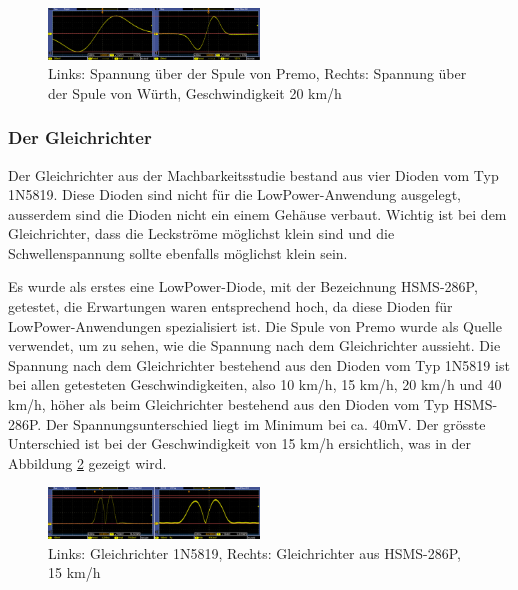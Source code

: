 \begin{figure}[ht]
    \includegraphics[width=0.5\textwidth]{3Vorgehen/imag/Messung_Optimierung_Spule.png}
    \caption{Links: Spannung über der Spule von Premo, Rechts: Spannung über der Spule von Würth, Geschwindigkeit 20 km/h}               
    \label{messung_optimierung_spule} 
\end{figure}

\subsubsection{Der Gleichrichter}

Der Gleichrichter aus der Machbarkeitsstudie bestand aus vier Dioden vom Typ 1N5819. Diese Dioden sind nicht für die LowPower-Anwendung ausgelegt, ausserdem sind die Dioden nicht ein einem Gehäuse verbaut. Wichtig ist bei dem Gleichrichter, dass die Leckströme möglichst klein sind und die Schwellenspannung sollte ebenfalls möglichst klein sein.

Es wurde als erstes eine LowPower-Diode, mit der Bezeichnung HSMS-286P, getestet, die Erwartungen waren entsprechend hoch, da diese Dioden für LowPower-Anwendungen spezialisiert ist. Die Spule von Premo wurde als Quelle verwendet, um zu sehen, wie die Spannung nach dem Gleichrichter aussieht. Die Spannung nach dem Gleichrichter bestehend aus den Dioden vom Typ 1N5819 ist bei allen getesteten Geschwindigkeiten, also 10 km/h, 15 km/h, 20 km/h und 40 km/h, höher als beim Gleichrichter bestehend aus den Dioden vom Typ HSMS-286P. Der Spannungsunterschied liegt im Minimum bei ca. 40mV. Der grösste Unterschied ist bei der Geschwindigkeit von 15 km/h ersichtlich, was in der Abbildung \ref{messung_optimierung_gleichrichter_1} gezeigt wird.

\begin{figure}[ht]
    \includegraphics[width=0.5\textwidth]{3Vorgehen/imag/Messung_Optimierung_Gleichrichter_1.png}
    \caption{Links: Gleichrichter 1N5819, Rechts: Gleichrichter aus HSMS-286P, 15 km/h}
    \label{messung_optimierung_gleichrichter_1} 
\end{figure}

